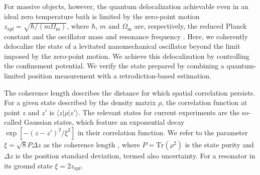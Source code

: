 \documentclass[aps,amssymb,amsmath,prl,superscriptaddress,reprint,noshowpacs]{revtex4-1}
\newcommand{\Om}{\Omega_\mathrm{m}}
\newcommand{\zzpf}{z_\mathrm{zpf}}
\begin{document}
%
For massive objects, however, the quantum delocalization achievable even in an ideal zero temperature bath is limited by the zero-point motion $\zzpf=\sqrt{\hbar/(m\Om)}$, where $
\hbar$, $m$ and $\Om$ are, respectively, the reduced Planck constant and the oscillator mass and resonance frequency \cite{oconnell_quantum_2010, teufel_sideband_2011, rossi_measurement-based_2018, bild_schrodinger_2023}.
%
Here, we coherently delocalize the state of a levitated nanomechanical oscillator beyond the limit imposed by the zero-point motion.
%
We achieve this delocalization by controlling the confinement potential.
%
We verify the state prepared by combining  a quantum-limited position measurement with a retrodiction-based estimation.

The coherence length describes the distance for which spatial correlation persists.
%
For a given state described by the density matrix $\rho$, the correlation function at point $z$ and $z'$ is $\langle z|\rho|z'\rangle$.
%
The relevant states for current experiments are the so-called Gaussian states, which feature an exponential decay $\exp[-(z-z')^2/\xi^2]$ in their correlation function.
%
We refer to the parameter $\xi=\sqrt{8}P\Delta z$ as the coherence length \cite{romero-isart_quantum_2011}, where $P=\mathrm{Tr}(\rho^2)$ is the state purity and $\Delta z$ is the position standard deviation, termed also uncertainty.
%
For a resonator in its ground state  $\xi=2\zzpf$.
%
\end{document}
